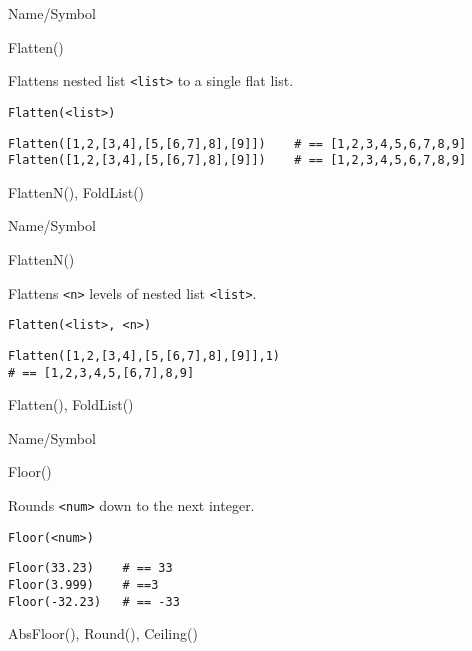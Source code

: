 \rl



\begin{desc}{Name/Symbol}
\item[Name/Symbol]	Flatten()

\item[Description]
	Flattens nested list \verb+<list>+ to a single flat list.

\item[Usage]
\begin{verbatim}
Flatten(<list>)
\end{verbatim}

\item[Example]
\begin{verbatim}
Flatten([1,2,[3,4],[5,[6,7],8],[9]])	# == [1,2,3,4,5,6,7,8,9]
Flatten([1,2,[3,4],[5,[6,7],8],[9]])	# == [1,2,3,4,5,6,7,8,9]
\end{verbatim}

\item[See Also]	FlattenN(), FoldList()
\end{desc}

\rl




\begin{desc}{Name/Symbol}
\item[Name/Symbol]	FlattenN()

\item[Description]	Flattens \verb+<n>+ levels of nested list \verb+<list>+. 

\item[Usage]
\begin{verbatim}
Flatten(<list>, <n>)
\end{verbatim}

\item[Example]
\begin{verbatim}
Flatten([1,2,[3,4],[5,[6,7],8],[9]],1) 
# == [1,2,3,4,5,[6,7],8,9]
\end{verbatim}

\item[See Also]	Flatten(), FoldList()
\end{desc}

\rl




\begin{desc}{Name/Symbol}
\item[Name/Symbol]	Floor()

\item[Description]	Rounds \verb+<num>+ down to the next integer.

\item[Usage]
\begin{verbatim}
Floor(<num>)
\end{verbatim}

\item[Example]
\begin{verbatim}
Floor(33.23)	# == 33
Floor(3.999)  	# ==3
Floor(-32.23) 	# == -33
\end{verbatim}
 
\item[See Also]	AbsFloor(), Round(), Ceiling()
\end{desc}

